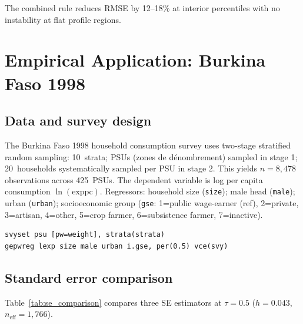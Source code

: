 \documentclass[12pt,a4paper]{article}
\theoremstyle{definition}
\begin{document}
The combined rule reduces RMSE by 12--18\% at interior percentiles with
no instability at flat profile regions.

\section{Empirical Application: Burkina Faso 1998}
\label{sec:application}

\subsection{Data and survey design}

The Burkina Faso 1998 household consumption survey \citep{INSD1998}
uses two-stage stratified random sampling: 10~strata; PSUs (zones de
d\'{e}nombrement) sampled in stage 1; 20~households systematically
sampled per PSU in stage 2. This yields $n=8{,}478$ observations across
425~PSUs. The dependent variable is log per capita consumption
$\ln(\text{exppc})$. Regressors: household size (\texttt{size}); male
head (\texttt{male}); urban (\texttt{urban}); socioeconomic group
(\texttt{gse}: 1=public wage-earner (ref), 2=private, 3=artisan,
4=other, 5=crop farmer, 6=subsistence farmer, 7=inactive).

\begin{verbatim}
svyset psu [pw=weight], strata(strata)
gepwreg lexp size male urban i.gse, per(0.5) vce(svy)
\end{verbatim}

\subsection{Standard error comparison}

Table~\ref{tab:se_comparison} compares three SE estimators at
$\tau=0.5$ ($h=0.043$, $n_{\mathrm{eff}}=1{,}766$).
\end{document}

